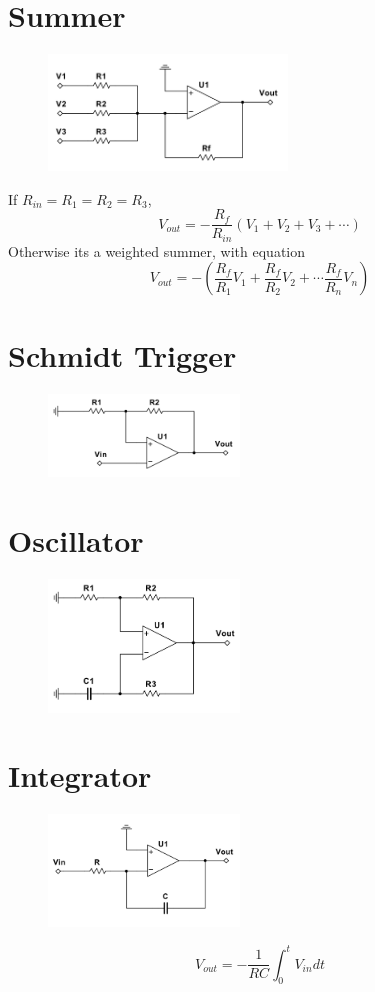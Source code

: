 \section{Summer}
\begin{figure}[H]
	\centering
	\includegraphics[width=2.5in]{opamps/summer.png}
	\label{fig:fig}
\end{figure}
If $R_{in} =R_1=R_2=R_3$,
\[V_{out} = -\frac{R_f}{R_{in}}\left(V_1 + V_2 + V_3 + \cdots\right) \] 
Otherwise its a weighted summer, with equation
\[V_{out}= -\left(\frac{R_f}{R_1}V_1 + \frac{R_f}{R_2}V_2 + \cdots \frac{R_f}{R_n}V_n\right) \]


\section{Schmidt Trigger}
\begin{figure}[H]
	\centering
	\includegraphics[width=2in]{opamps/schmidt.png}
	\label{fig:fig}
\end{figure}

\section{Oscillator}
\begin{figure}[H]
	\centering
	\includegraphics[width=2in]{opamps/oscillator.png}
	\label{fig:fig}
\end{figure}

\section{Integrator}
\begin{figure}[H]
	\centering
	\includegraphics[width=2in]{opamps/integrator.png}
	\label{fig:fig}
\end{figure}
\[V_{out}= -\frac{1}{RC}\int_{0}^{t}V_{in}dt \]
